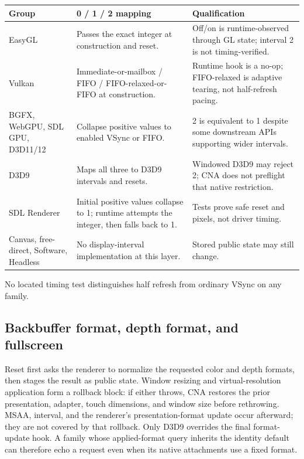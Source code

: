 \begin{center}
\small
\begin{tabular}{@{}p{}p{}p{}@{}}
\toprule
\textbf{Group} & \textbf{0 / 1 / 2 mapping} & \textbf{Qualification} \\
\midrule
EasyGL & Passes the exact integer at construction and reset. & Off/on is runtime-observed through GL state; interval 2 is not timing-verified. \\
Vulkan & Immediate-or-mailbox / FIFO / FIFO-relaxed-or-FIFO at construction. & Runtime hook is a no-op; FIFO-relaxed is adaptive tearing, not half-refresh pacing. \\
BGFX, WebGPU, SDL GPU, D3D11/12 & Collapse positive values to enabled VSync or FIFO. & 2 is equivalent to 1 despite some downstream APIs supporting wider intervals. \\
D3D9 & Maps all three to D3D9 intervals and resets. & Windowed D3D9 may reject 2; CNA does not preflight that native restriction. \\
SDL Renderer & Initial positive values collapse to 1; runtime attempts the integer, then falls back to 1. & Tests prove safe reset and pixels, not driver timing. \\
Canvas, free-direct, Software, Headless & No display-interval implementation at this layer. & Stored public state may still change. \\
\bottomrule
\end{tabular}
\end{center}

No located timing test distinguishes half refresh from ordinary VSync on any family.

\subsection{Backbuffer format, depth format, and fullscreen}
\label{sec:backend-presentation-format-matrix}

Reset first asks the renderer to normalize the requested color and depth formats, then stages the
result as public state. Window resizing and virtual-resolution application form a rollback block:
if either throws, CNA restores the prior presentation, adapter, touch dimensions, and window size
before rethrowing. MSAA, interval, and the renderer's presentation-format update occur afterward;
they are not covered by that rollback. Only D3D9 overrides the final format-update hook. A family
whose applied-format query inherits the identity default can therefore echo a request even when
its native attachments use a fixed format.

